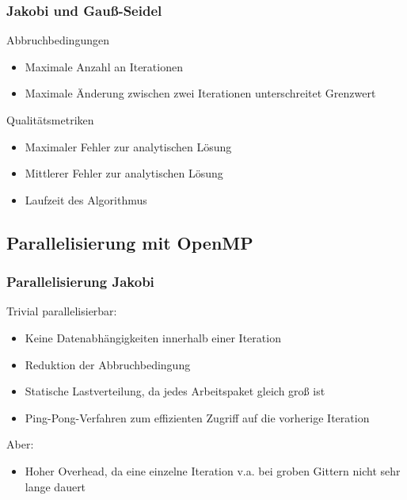 \documentclass{beamer}
\begin{document}
\begin{frame}
    \frametitle{Jakobi und Gauß-Seidel}
    \begin{block}{Abbruchbedingungen}
        \begin{itemize}
            \item Maximale Anzahl an Iterationen
            \item Maximale Änderung zwischen zwei Iterationen unterschreitet Grenzwert
        \end{itemize}
    \end{block}
    \begin{block}{Qualitätsmetriken}
        \begin{itemize}
            \item Maximaler Fehler zur analytischen Lösung
            \item Mittlerer Fehler zur analytischen Lösung
            \item Laufzeit des Algorithmus
        \end{itemize}
    \end{block}
\end{frame}

\subsection{Parallelisierung mit OpenMP}
\begin{frame}
    \frametitle{Parallelisierung Jakobi}
    Trivial parallelisierbar:
    \begin{itemize}
        \item Keine Datenabhängigkeiten innerhalb einer Iteration
        \item Reduktion der Abbruchbedingung
        \item Statische Lastverteilung, da jedes Arbeitspaket gleich groß ist
        \item Ping-Pong-Verfahren zum effizienten Zugriff auf die vorherige Iteration
    \end{itemize}
    Aber:
    \begin{itemize}
        \item Hoher Overhead, da eine einzelne Iteration v.a. bei groben Gittern nicht sehr lange dauert
    \end{itemize}
\end{frame}
\end{document}
